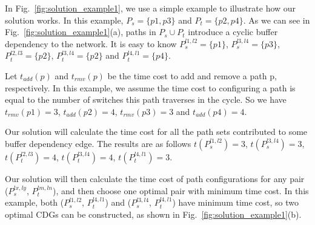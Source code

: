 In Fig.~\ref{fig:solution_example1}, we use a simple example to illustrate how our solution works. In this example, $P_s=\{p1, p3\}$ and $P_t=\{p2, p4\}$. As we can see in Fig.~\ref{fig:solution_example1}(a), paths in $P_s \cup P_t$ introduce a cyclic buffer dependency to the network. It is easy to know $P_s^{l1,l2} = \{p1\}$, $P_s^{l3,l4} = \{p3\}$, $P_t^{l2,l3} = \{p2\}$, $P_t^{l3,l4} = \{p2\}$ and $P_t^{l4,l1} = \{p4\}$.

Let $t_{add}(p)$ and $t_{rmv}(p)$ be the time cost to add and remove a path p, respectively. In this example, we assume  the time cost to configuring a path is equal to the number of switches this path traverses in the cycle. So we have $t_{rmv}(p1)=3$, $t_{add}(p2)=4$, $t_{rmv}(p3)=3$ and $t_{add}(p4)=4$.

Our solution will calculate the time cost for all the path sets contributed to some buffer dependency edge. The results are as follows $t(P_s^{l1,l2}) = 3$, $t(P_s^{l3,l4}) = 3$, $t(P_t^{l2,l3}) = 4$, $t(P_t^{l3,l4}) = 4$, $t(P_t^{l4,l1}) = 3$.

Our solution will then calculate the time cost of path configurations for any pair ($P_s^{lx,ly}$, $P_t^{lm,ln}$), and then choose one optimal pair with minimum time cost. In this example, both ($P_s^{l1,l2}$, $P_t^{l4,l1}$) and ($P_s^{l3,l4}$, $P_t^{l4,l1}$) have minimum time cost, so two optimal CDGs can be constructed, as shown in Fig.~\ref{fig:solution_example1}(b). 


%

